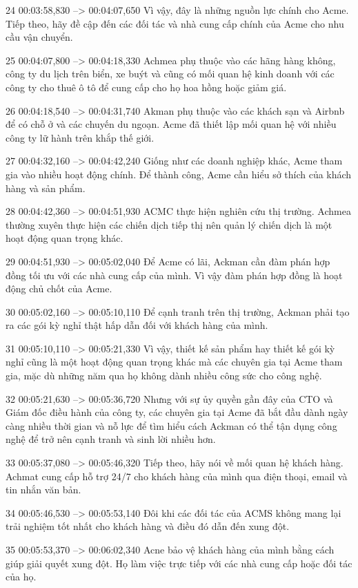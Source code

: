 24
00:03:58,830 --> 00:04:07,650
Vì vậy, đây là những nguồn lực chính cho Acme.  Tiếp theo, hãy đề cập đến các đối tác và nhà cung cấp chính của Acme cho nhu cầu vận chuyển.

25
00:04:07,800 --> 00:04:18,330
Achmea phụ thuộc vào các hãng hàng không, công ty du lịch trên biển, xe buýt và cũng có mối quan hệ kinh doanh với các công ty cho thuê ô tô để cung cấp cho họ hoa hồng hoặc giảm giá.

26
00:04:18,540 --> 00:04:31,740
Akman phụ thuộc vào các khách sạn và Airbnb để có chỗ ở và các chuyến du ngoạn.  Acme đã thiết lập mối quan hệ với nhiều công ty lữ hành trên khắp thế giới.

27
00:04:32,160 --> 00:04:42,240
Giống như các doanh nghiệp khác, Acme tham gia vào nhiều hoạt động chính. Để thành công, Acme cần hiểu sở thích của khách hàng và sản phẩm.

28
00:04:42,360 --> 00:04:51,930
ACMC thực hiện nghiên cứu thị trường.  Achmea thường xuyên thực hiện các chiến dịch tiếp thị nên quản lý chiến dịch là một hoạt động quan trọng khác.

29
00:04:51,930 --> 00:05:02,040
Để Acme có lãi, Ackman cần đàm phán hợp đồng tối ưu với các nhà cung cấp của mình.  Vì vậy đàm phán hợp đồng là hoạt động chủ chốt của Acme.

30
00:05:02,160 --> 00:05:10,110
Để cạnh tranh trên thị trường, Ackman phải tạo ra các gói kỳ nghỉ thật hấp dẫn đối với khách hàng của mình.

31
00:05:10,110 --> 00:05:21,330
Vì vậy, thiết kế sản phẩm hay thiết kế gói kỳ nghỉ cũng là một hoạt động quan trọng khác mà các chuyên gia tại Acme tham gia, mặc dù những năm qua họ không dành nhiều công sức cho công nghệ.

32
00:05:21,630 --> 00:05:36,720
Nhưng với sự ủy quyền gần đây của CTO và Giám đốc điều hành của công ty, các chuyên gia tại Acme đã bắt đầu dành ngày càng nhiều thời gian và nỗ lực để tìm hiểu cách Ackman có thể tận dụng công nghệ để trở nên cạnh tranh và sinh lời nhiều hơn.

33
00:05:37,080 --> 00:05:46,320
Tiếp theo, hãy nói về mối quan hệ khách hàng.  Achmat cung cấp hỗ trợ 24/7 cho khách hàng của mình qua điện thoại, email và tin nhắn văn bản.

34
00:05:46,530 --> 00:05:53,140
Đôi khi các đối tác của ACMS không mang lại trải nghiệm tốt nhất cho khách hàng và điều đó dẫn đến xung đột.

35
00:05:53,370 --> 00:06:02,340
Acne bảo vệ khách hàng của mình bằng cách giúp giải quyết xung đột.  Họ làm việc trực tiếp với các nhà cung cấp hoặc đối tác của họ.

